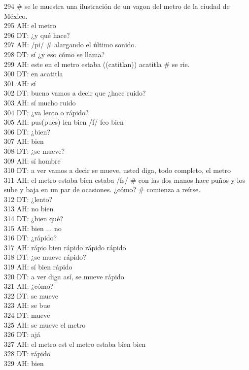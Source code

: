 294 # se le muestra una ilustración de un vagon del metro de la ciudad de México.\\
295 AH: el metro\\
296 DT: ¿y qué hace?\\
297 AH: /pi/ # alargando el último sonido.\\
298 DT: sí ¿y eso cómo se llama?\\
299 AH: este en el metro estaba ((catitlan)) acatitla # se rie.\\
300 DT: en acatitla\\
301 AH: sí\\
302 DT: bueno vamos a decir que ¿hace ruido?\\
303 AH: sí mucho ruido\\
304 DT: ¿va lento o rápido?\\
305 AH: pus(pues) len bien /f/ feo bien \\
306 DT: ¿bien?\\
307 AH: bien\\
308 DT: ¿se mueve?\\
309 AH: sí hombre\\
310 DT: a ver vamos a decir se mueve, usted diga, todo completo, el metro\\
311 AH: el metro estaba bien estaba /fs/ # con las dos manos hace puños y los sube y baja en un par de ocasiones. ¿cómo? # comienza a reírse.\\
312 DT: ¿lento?\\
313 AH: no bien\\
314 DT: ¿bien qué?\\
315 AH: bien ... no\\
316 DT: ¿rápido?\\
317 AH: rápio bien rápido rápido rápido\\
318 DT: ¿se mueve rápido?\\
319 AH: sí bien rápido\\
320 DT: a ver diga así, se mueve rápido\\
321 AH: ¿cómo?\\
322 DT: se mueve\\
323 AH: se bue\\
324 DT: mueve\\
325 AH: se mueve el metro\\
326 DT: ajá\\
327 AH: el metro est el metro estaba bien bien \\
328 DT: rápido\\
329 AH: bien\\
